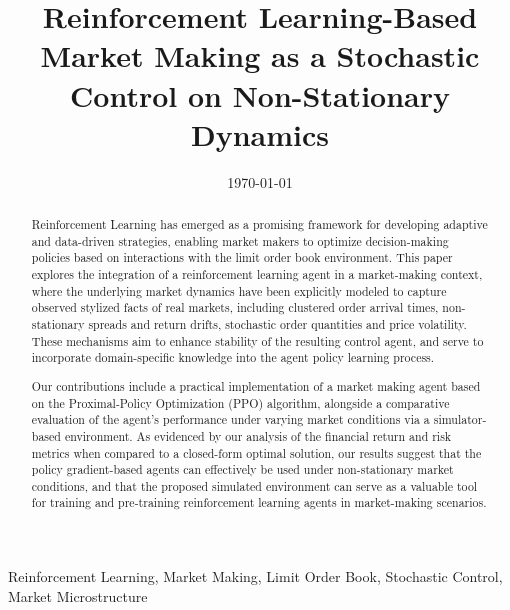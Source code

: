 \title{Reinforcement Learning-Based Market Making as a Stochastic Control on Non-Stationary Dynamics}


\author{
}

\date{\today}

\maketitle

\begin{abstract}
    Reinforcement Learning has emerged as a promising framework for developing adaptive and data-driven strategies,
    enabling market makers to optimize decision-making policies based on interactions with the limit order book environment.
    This paper explores the integration of a reinforcement learning agent in a market-making context,
    where the underlying market dynamics have been explicitly modeled to capture observed stylized facts of real markets,
    including clustered order arrival times, non-stationary spreads and return drifts, stochastic order quantities and price volatility.
    These mechanisms aim to enhance stability of the resulting control agent,
    and serve to incorporate domain-specific knowledge into the agent policy learning process.

    Our contributions include a practical implementation of a market making agent based on the Proximal-Policy Optimization (PPO) algorithm,
    alongside a comparative evaluation of the agent's performance under varying market conditions via a simulator-based environment.
    As evidenced by our analysis of the financial return and risk metrics when compared to a closed-form optimal solution,
    our results suggest that the policy gradient-based agents can effectively be used under non-stationary market conditions,
    and that the proposed simulated environment can serve as a valuable tool for training and
    pre-training reinforcement learning agents in market-making scenarios.
\end{abstract}

\begin{IEEEkeywords}
    Reinforcement Learning, Market Making, Limit Order Book, Stochastic Control, Market Microstructure
\end{IEEEkeywords}
